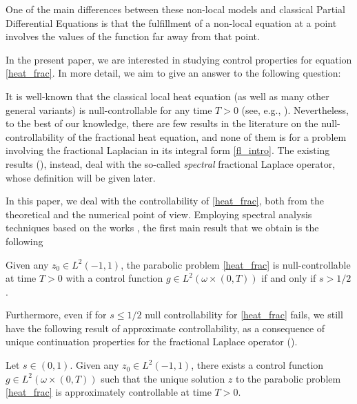 One of the main differences between these non-local models and classical Partial Differential Equations is that the fulfillment of a non-local equation at a point involves the values of the function far away from that point.

In the present paper, we are interested in studying control properties for equation \eqref{heat_frac}. In more detail, we aim to give an answer to the following question:


It is well-known that the classical local heat equation (as well as many other general variants) is null-controllable for any time $T>0$ (see, e.g., \cite{fattorini1971exact,fursikov1996controllability,lebeau1995controle}). Nevertheless, to the best of our knowledge, there are few results in the literature on the null-controllability of the fractional heat equation, and none of them is for a problem involving the fractional Laplacian in its integral form \eqref{fl_intro}. The existing results (\cite{micu2006controllability,miller2006controllability}), instead, deal with the so-called \textit{spectral} fractional Laplace operator, whose definition will be given later. 

In this paper, we deal with the controllability of \eqref{heat_frac}, both from the theoretical and the numerical point of view. Employing spectral analysis techniques based on the works \cite{kulczycki2010spectral,kwasnicki2012eigenvalues}, the first main result that we obtain is the following

\begin{theorem}\label{null_control_thm}
Given any $z_0\in L^2(-1,1)$, the parabolic problem \eqref{heat_frac} is null-controllable at time $T>0$ with a control function $g\in L^2(\omega\times(0,T))$ if and only if $s>1/2$.  
\end{theorem}

Furthermore, even if for $s\leq 1/2$ null controllability for \eqref{heat_frac} fails, we still have the following result of approximate controllability, as a consequence of unique continuation properties for the fractional Laplace operator (\cite{fall2014unique}). 

\begin{theorem}\label{approx_control_thm}
Let $s\in(0,1)$. Given any $z_0\in L^2(-1,1)$, there exists a control function $g\in L^2(\omega\times(0,T))$ such that the unique solution $z$ to the parabolic problem \eqref{heat_frac} is approximately controllable at time $T>0$.
\end{theorem}

